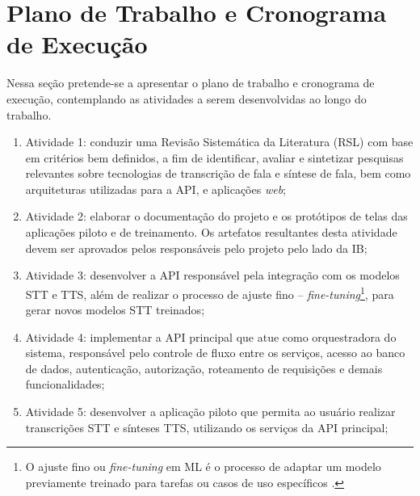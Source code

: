 \documentclass[
	12pt,				%
	a4paper,			%
	english,			%
	brazil,				%
	]{article}
\begin{document}


    	
\section{Plano de Trabalho e Cronograma de Execução}

Nessa seção pretende-se a apresentar o plano de trabalho e cronograma de execução,
contemplando as atividades a serem desenvolvidas ao longo do trabalho.

\begin{enumerate}
	\item  Atividade 1: conduzir uma Revisão Sistemática da Literatura (RSL) com base em critérios bem definidos, a fim de identificar, avaliar e sintetizar pesquisas relevantes sobre tecnologias de transcrição de fala e síntese de fala, bem como arquiteturas utilizadas para a API,  e aplicações \textit{web}; \label{atv1}
	
	\item Atividade 2: elaborar o documentação do projeto e os protótipos de telas das aplicações piloto e de treinamento. Os artefatos resultantes desta atividade devem ser aprovados pelos responsáveis pelo projeto pelo lado da IB; \label{atv2}
	
	
	\item Atividade 3: desenvolver a API responsável pela integração com os modelos STT e TTS, além de realizar o processo de ajuste fino – \textit{fine-tuning}\footnote{O ajuste fino ou \textit{fine-tuning} em ML é o processo de adaptar um modelo previamente treinado para tarefas ou casos de uso específicos \cite{bergmann2024}.}, para gerar novos modelos STT treinados; \label{atv3}
	
	
	\item Atividade 4: implementar a API principal que atue como orquestradora do sistema, responsável pelo controle de fluxo entre os serviços, acesso ao banco de dados, autenticação, autorização, roteamento de requisições e demais funcionalidades; \label{atv4}
	
	\item Atividade 5: desenvolver a aplicação piloto que permita ao usuário realizar transcrições STT e sínteses TTS, utilizando os serviços da API principal; \label{atv5}
	

\end{enumerate}
\end{document}
